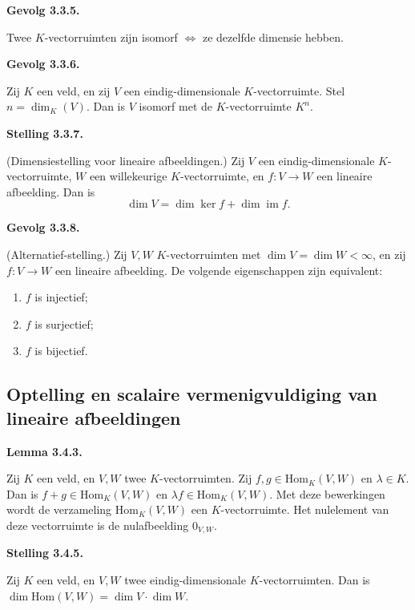 \documentclass[10pt,a4paper]{article}
\newenvironment{res}[2]{%
  \par\noindent\textbf{#1 #2.}%
}{%
  \par\vspace{2pt}\normalfont
}
\begin{document}
\begin{res}{Gevolg}{3.3.5}
Twee $K$-vectorruimten zijn isomorf \(\iff\) ze dezelfde dimensie hebben.
\end{res}

\begin{res}{Gevolg}{3.3.6}
Zij $K$ een veld, en zij $V$ een eindig-dimensionale $K$-vectorruimte. Stel $n=\dim_K(V)$. Dan is $V$ isomorf met de $K$-vectorruimte $K^n$.
\end{res}

\begin{res}{Stelling}{3.3.7}
\textup{(Dimensiestelling voor lineaire afbeeldingen.)} Zij $V$ een eindig-dimensionale $K$-vectorruimte, $W$ een willekeurige $K$-vectorruimte, en $f:V\to W$ een lineaire afbeelding. Dan is
\[
\dim V=\dim\ker f+\dim\operatorname{im} f.
\]
\end{res}

\begin{res}{Gevolg}{3.3.8}
\textup{(Alternatief-stelling.)} Zij $V,W$ $K$-vectorruimten met $\dim V=\dim W<\infty$, en zij $f:V\to W$ een lineaire afbeelding. De volgende eigenschappen zijn equivalent:
\begin{enumerate}[label=(\alph*),leftmargin=1.8em,itemsep=1pt,topsep=1pt]
\item $f$ is injectief;
\item $f$ is surjectief;
\item $f$ is bijectief.
\end{enumerate}
\end{res}

\subsection{Optelling en scalaire vermenigvuldiging van lineaire afbeeldingen}
\begin{res}{Lemma}{3.4.3}
Zij $K$ een veld, en $V,W$ twee $K$-vectorruimten. Zij $f,g\in\mathrm{Hom}_K(V,W)$ en $\lambda\in K$. Dan is $f+g\in\mathrm{Hom}_K(V,W)$ en $\lambda f\in\mathrm{Hom}_K(V,W)$. Met deze bewerkingen wordt de verzameling $\mathrm{Hom}_K(V,W)$ een $K$-vectorruimte. Het nulelement van deze vectorruimte is de nulafbeelding $0_{V,W}$.
\end{res}

\begin{res}{Stelling}{3.4.5}
Zij $K$ een veld, en $V,W$ twee eindig-dimensionale $K$-vectorruimten. Dan is $\dim\mathrm{Hom}(V,W)=\dim V\cdot \dim W$.
\end{res}
\end{document}
